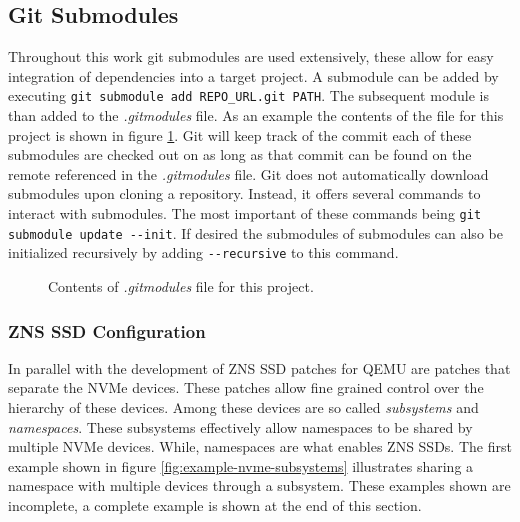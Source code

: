 \documentclass[conference]{IEEEtran}
\newcommand\bashstyle{
	\lstset{
		language=Bash,
		basicstyle=\ttm,
		showstringspaces=false,
		tabsize=2,
		aboveskip=0.2cm,
		belowskip=0.2cm,
		prebreak=\textbackslash,
		extendedchars=true,
		mathescape=false,
		linewidth=8.85cm,
		breaklines=true
	}
}
\newcommand\bashinline[1]{{\bashstyle\lstinline!#1!}}
\newcommand\bashexternal[2][]{{\bashstyle}}
\begin{document}

\subsection{Git Submodules}

Throughout this work git submodules are used extensively, these allow for easy
integration of dependencies into a target project. A submodule can be added by
executing\bashinline{git submodule add REPO_URL.git PATH}. The subsequent
module is than added to the \textit{.gitmodules} file. As an example the
contents of the file for this project is shown in
figure \ref{fig:example-gitmodules}. Git will keep track of the commit each of
these  submodules are checked out on as long as that commit can be found on the
remote referenced in the \textit{.gitmodules} file. Git does not automatically
download  submodules upon cloning a repository. Instead, it offers several
commands to  interact with submodules. The most important of these commands
being\bashinline{git submodule update --init}. If desired the submodules of
submodules can also be initialized recursively by adding\bashinline{--recursive}
to this command.

\begin{center}
	\begin{figure}[H]
		\bashexternal{resources/bash/gitmodules.sh}
		\captionsetup{justification=centering}
		\caption{Contents of \textit{.gitmodules} file for this project.}
		\label{fig:example-gitmodules}
	\end{figure}
\end{center}

\subsubsection{ZNS SSD Configuration}

In parallel with the development of ZNS SSD patches for QEMU are patches that
separate the NVMe devices. These patches allow fine grained control over the
hierarchy of these devices. Among these devices are so called
\textit{subsystems} and \textit{namespaces}. These subsystems effectively allow
namespaces to be shared by multiple NVMe devices. While, namespaces are what
enables ZNS SSDs. The first example shown in
figure \ref{fig:example-nvme-subsystems} illustrates sharing a namespace with
multiple  devices through a subsystem. These examples shown are incomplete, a
complete  example is shown at the end of this section.
\end{document}

